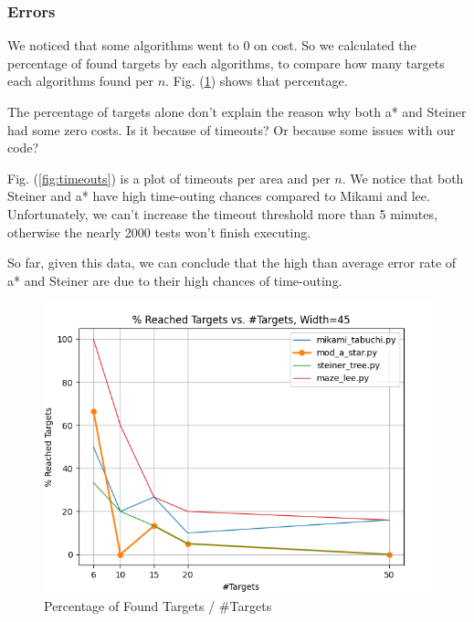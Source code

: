 \subsubsection{Errors}
We noticed that some algorithms went to 0 on cost. So we calculated the percentage of found targets by each algorithms, to compare how many targets each algorithms found per $n$. Fig. (\ref{fig:percTargets}) shows that percentage.

The percentage of targets alone don't explain the reason why both a* and Steiner had some zero costs.  Is it because of timeouts? Or because some issues with our code?

Fig. (\ref{fig:timeouts}) is a plot of timeouts per area and per $n$. We notice that both Steiner and a* have high time-outing chances compared to Mikami and lee. Unfortunately, we can't increase the timeout threshold more than 5 minutes, otherwise the nearly 2000 tests won't finish executing.

So far, given this data, we can conclude that the high than average error rate of a* and Steiner are due to their high chances of time-outing.

\begin{figure}
\centering
\includegraphics[width=\linewidth]{figures/plots/percTargets_areaConst.png}
\caption{Percentage of Found Targets / \#Targets}
\label{fig:percTargets}
\end{figure}

